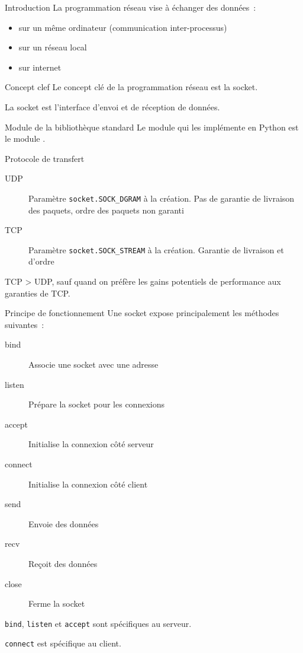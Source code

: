 \begin{frame}{Introduction}
  La programmation réseau vise à échanger des données~:

  \begin{itemize}
    \item sur un même ordinateur (communication inter-processus)
    \item sur un réseau local
    \item sur internet
  \end{itemize}
\end{frame}

\begin{frame}{Concept clef}
  Le concept clé de la programmation réseau est la socket.

  La socket est l'interface d'envoi et de réception de données.
\end{frame}

\begin{frame}{Module de la bibliothèque standard}
  Le module qui les implémente en Python est le module .
\end{frame}

\begin{frame}{Protocole de transfert}
  \begin{description}
    \item[UDP] Paramètre \texttt{socket.SOCK\_DGRAM} à la création. Pas de garantie de livraison des paquets, ordre des paquets non garanti
    \item[TCP] Paramètre \texttt{socket.SOCK\_STREAM} à la création. Garantie de livraison et d'ordre
  \end{description}

  TCP > UDP, sauf quand on préfère les gains potentiels de performance aux garanties de TCP.
\end{frame}

\begin{frame}{Principe de fonctionnement}
  Une socket expose principalement les méthodes suivantes~:

  \begin{description}
    \item[bind] Associe une socket avec une adresse
    \item[listen] Prépare la socket pour les connexions
    \item[accept] Initialise la connexion côté serveur
    \item[connect] Initialise la connexion côté client
    \item[send] Envoie des données
    \item[recv] Reçoit des données
    \item[close] Ferme la socket
  \end{description}

  \texttt{bind}, \texttt{listen} et \texttt{accept} sont spécifiques au serveur.

  \texttt{connect} est spécifique au client.
\end{frame}

